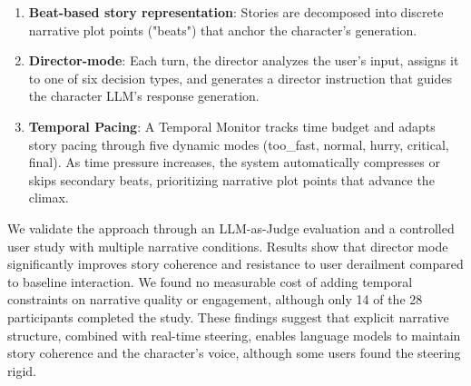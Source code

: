 \begin{enumerate}
\item \textbf{Beat-based story representation}: Stories are decomposed into discrete narrative plot points ("beats") that anchor the character's generation. 

\item \textbf{Director-mode}: Each turn, the director analyzes the user's input, assigns it to one of six decision types, and generates a director instruction that guides the character LLM's response generation.

\item \textbf{Temporal Pacing}: A Temporal Monitor tracks time budget and adapts story pacing through five dynamic modes (too\_fast, normal, hurry, critical, final). As time pressure increases, the system automatically compresses or skips secondary beats, prioritizing narrative plot points that advance the climax.


\end{enumerate}

We validate the approach through an LLM-as-Judge evaluation and a controlled user study with multiple narrative conditions. Results show that director mode significantly improves story coherence and resistance to user derailment compared to baseline interaction. We found no measurable cost of adding temporal constraints on narrative quality or engagement, although only 14 of the 28 participants completed the study. These findings suggest that explicit narrative structure, combined with real-time steering, enables language models to maintain story coherence and the character's voice, although some users found the steering rigid.
